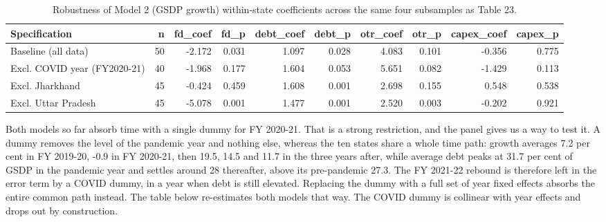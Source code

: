 \documentclass[12pt,a4paper]{article}
\begin{document}
\begin{table}[H]
\centering
\addtocounter{table}{-1}\renewcommand{\thetable}{\arabic{table}a}
\caption{Robustness of Model 2 (GSDP growth) within-state coefficients across the same four subsamples as Table 23.}
\label{tab:23a}
\renewcommand{\thetable}{\arabic{table}}
\footnotesize
\begin{adjustbox}{max width=\textwidth}
\begin{tabular}{@{}lrrrrrrrrr@{}}
\toprule
Specification & n & fd\_coef & fd\_p & debt\_coef & debt\_p & otr\_coef & otr\_p & capex\_coef & capex\_p \\
\midrule
Baseline (all data) & 50 & -2.172 & 0.031 & 1.097 & 0.028 & 4.083 & 0.101 & -0.356 & 0.775 \\
Excl. COVID year (FY2020-21) & 40 & -1.968 & 0.177 & 1.604 & 0.053 & 5.651 & 0.082 & -1.429 & 0.113 \\
Excl. Jharkhand & 45 & -0.424 & 0.459 & 1.608 & 0.001 & 2.698 & 0.155 & 0.548 & 0.538 \\
Excl. Uttar Pradesh & 45 & -5.078 & 0.001 & 1.477 & 0.001 & 2.520 & 0.003 & -0.202 & 0.921 \\
\bottomrule
\end{tabular}
\end{adjustbox}
\end{table}

Both models so far absorb time with a single dummy for FY 2020-21. That is a strong restriction, and the panel gives us a way to test it. A dummy removes the level of the pandemic year and nothing else, whereas the ten states share a whole time path: growth averages 7.2 per cent in FY 2019-20, -0.9 in FY 2020-21, then 19.5, 14.5 and 11.7 in the three years after, while average debt peaks at 31.7 per cent of GSDP in the pandemic year and settles around 28 thereafter, above its pre-pandemic 27.3. The FY 2021-22 rebound is therefore left in the error term by a COVID dummy, in a year when debt is still elevated. Replacing the dummy with a full set of year fixed effects absorbs the entire common path instead. The table below re-estimates both models that way. The COVID dummy is collinear with year effects and drops out by construction.
\end{document}
